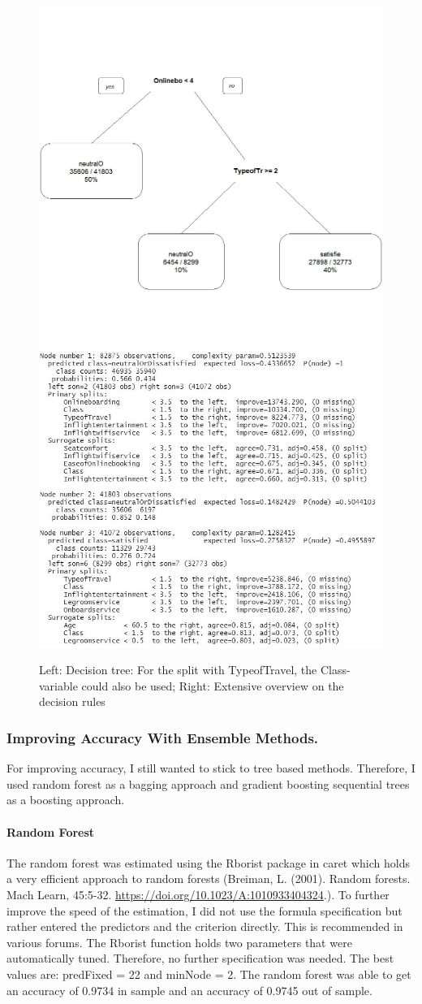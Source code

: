\documentclass[
]{article}
\begin{document}
\begin{figure}
  \includegraphics[width=.48\textwidth]{..//plots//decisiontree.jpg}
  \includegraphics[width=.48\textwidth]{..//plots//outputdecisiontree.jpg}
  \caption{Left: Decision tree: For the split with TypeofTravel, the Class-variable could also be used; Right: Extensive overview on the decision rules}\label{fig:foobar}
\end{figure}

\hypertarget{improving-accuracy-with-ensemble-methods.}{%
\subsubsection{Improving Accuracy With Ensemble
Methods.}\label{improving-accuracy-with-ensemble-methods.}}

For improving accuracy, I still wanted to stick to tree based methods.
Therefore, I used random forest as a bagging approach and gradient
boosting sequential trees as a boosting approach.

\hypertarget{random-forest}{%
\paragraph{Random Forest}\label{random-forest}}

The random forest was estimated using the Rborist package in caret which
holds a very efficient approach to random forests (Breiman, L. (2001).
Random forests. Mach Learn, 45:5-32.
\url{https://doi.org/10.1023/A:1010933404324}.). To further improve the
speed of the estimation, I did not use the formula specification but
rather entered the predictors and the criterion directly. This is
recommended in various forums. The Rborist function holds two parameters
that were automatically tuned. Therefore, no further specification was
needed. The best values are: predFixed = 22 and minNode = 2. The random
forest was able to get an accuracy of 0.9734 in sample and an accuracy
of 0.9745 out of sample.
\end{document}
